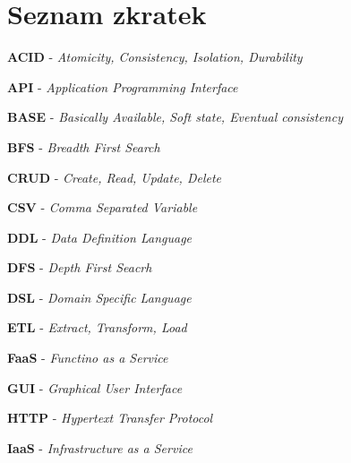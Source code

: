 \documentclass[11pt,twoside,a4paper]{book}
\begin{document}
	\tableofcontents		%

	\listoffigures			%
	\listoftables			%
	\lstlistoflistings         %

	\mainbodystarts












{
\def\CS{$\cal C\kern-0.1667em\lower.5ex\hbox{$\cal S$}\kern-0.075em $}

}

\appendix

\chapter{Seznam zkratek}
\printnomenclature
\label{apx:zkratky}

\textbf{ACID} - \textit{Atomicity, Consistency, Isolation, Durability}

\textbf{API} - \textit{Application Programming Interface}

\textbf{BASE} - \textit{Basically Available, Soft state, Eventual consistency}

\textbf{BFS} - \textit{Breadth First Search}

\textbf{CRUD} - \textit{Create, Read, Update, Delete}

\textbf{CSV} - \textit{Comma Separated Variable}

\textbf{DDL} - \textit{Data Definition Language}

\textbf{DFS} - \textit{Depth First Seacrh}

\textbf{DSL} - \textit{Domain Specific Language}

\textbf{ETL} - \textit{Extract, Transform, Load}

\textbf{FaaS} - \textit{Functino as a Service}

\textbf{GUI} - \textit{Graphical User Interface}

\textbf{HTTP} - \textit{Hypertext Transfer Protocol}

\textbf{IaaS} - \textit{Infrastructure as a Service}
\end{document}

